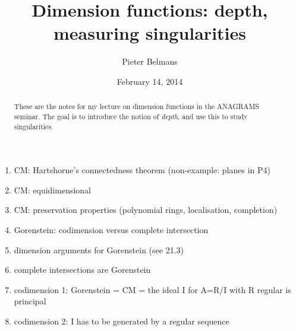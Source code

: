 \documentclass[10pt,a4paper]{article}
\title{Dimension functions: depth, measuring singularities}
\author{Pieter Belmans}
\date{February 14, 2014}
\begin{document}
\maketitle

\begin{abstract}
  These are the notes for my lecture on dimension functions in the ANAGRAMS seminar. The goal is to introduce the notion of \emph{depth}, and use this to study singularities.
\end{abstract}

\tableofcontents

\clearpage

\begin{enumerate}
  \item CM: Hartshorne's connectedness theorem (non-example: planes in P4)
  \item CM: equidimensional
  \item CM: preservation properties (polynomial rings, localisation, completion)
  \item Gorenstein: codimension versus complete intersection
  \item dimension arguments for Gorenstein (see 21.3)
  \item complete intersections are Gorenstein
  \item codimension 1: Gorenstein = CM = the ideal I for A=R/I with R regular is principal
  \item codimension 2: I has to be generated by a regular sequence
\end{enumerate}

\printbibliography
\end{document}
